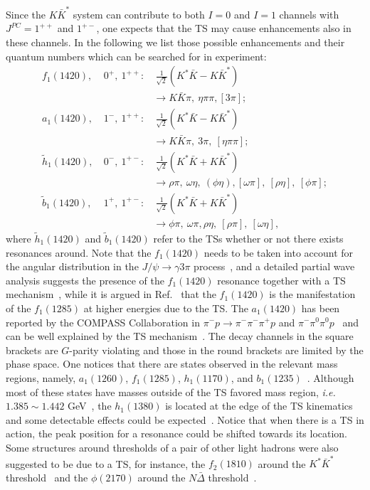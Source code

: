 Since the  $K\bar K^*$ system can contribute to both $I=0$ and $I=1$ channels
with $J^{PC}=1^{++}$ and $1^{+-}$,
 one expects that
the TS may cause enhancements also in these channels.
In the following we list those possible enhancements and their quantum
numbers which can be searched for in experiment:
\begin{eqnarray}\label{KKstar-TS}
f_1(1420), &\ 0^+, \ 1^{++}:& \ \frac{1}{\sqrt{2}}(K^*\bar{K}-K\bar{K}^*)
\nonumber\\
&& \to K\bar{K}\pi, \ \eta\pi\pi, [3\pi];\nonumber\\
a_1(1420), &\ 1^-, \ 1^{++}:& \ \frac{1}{\sqrt{2}}(K^*\bar{K}-K\bar{K}^*)
\nonumber\\
&&  \to K\bar{K}\pi, \ 3\pi, \ [\eta\pi\pi];\nonumber\\
\tilde{h}_1(1420), &\ 0^-, \ 1^{+-}:& \
\frac{1}{\sqrt{2}}(K^*\bar{K}+K\bar{K}^*) \nonumber\\
&&  \to \rho\pi, \ \omega\eta, \ (\phi\eta), [\omega\pi], \ [\rho\eta], \
[\phi\pi];\nonumber\\
\tilde{b}_1(1420), &\ 1^+, \ 1^{+-}:& \
\frac{1}{\sqrt{2}}(K^*\bar{K}+K\bar{K}^*) \nonumber\\
&&  \to \phi\pi, \ \omega\pi, \rho\eta, \ [\rho\pi], \ [\omega\eta],
\end{eqnarray}
where $\tilde{h}_1(1420)$ and $\tilde{b}_1(1420)$ refer to the TSs whether or
not there exists resonances around.
Note that the $f_1(1420)$ needs to be taken into
account for the angular distribution in the $J/\psi\to\gamma 3\pi$
process~\cite{BESIII:2012aa}, and a detailed
partial wave analysis suggests the presence of the $f_1(1420)$ resonance
together with a TS mechanism~\cite{Wu:2012pg},
while it is argued in Ref.~\cite{Debastiani:2016xgg} that the $f_1(1420)$ is
the manifestation of the $f_1(1285)$ at higher energies due to the TS.
The $a_1(1420)$ has been reported by the
COMPASS Collaboration in $\pi^-p\to \pi^-\pi^-\pi^+ p$ and $\pi^-\pi^0\pi^0
p$~\cite{Adolph:2015pws} and can be well explained by the TS
mechanism~\cite{Liu:2015taa,Ketzer:2015tqa}. The decay channels in the square
brackets are $G$-parity violating and those in the round brackets are limited by
the phase space. One notices that there are states observed in the relevant mass
regions, namely, $a_1(1260)$, $f_1(1285)$, $h_1(1170)$, and
$b_1(1235)$~\cite{Olive:2016xmw}. Although most of these states have masses
outside
of the TS favored mass region, {\sl i.e.} $1.385\sim 1.442$ GeV~\cite{Liu:2015taa},
the $h_1(1380)$ is located at the edge of the TS kinematics and some detectable
effects could be expected~\cite{Guo:2013nza,Ablikim:2013dyn}. Notice that when
there is a TS in action,  the peak position for a resonance could be shifted
towards its location.
Some structures around thresholds of a pair of other light hadrons were also suggested to be due to a TS, for instance, the $f_2(1810)$ around the $K^*\bar
K^*$ threshold~\cite{Xie:2016lvs} and the $\phi(2170)$ around the $N\bar \Delta$
threshold~\cite{Lorenz:2015pba}.

